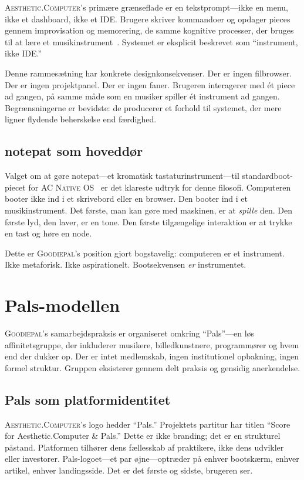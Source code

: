 \documentclass[10pt,letterpaper,twocolumn]{article}
\newcommand{\ac}{\textsc{Aesthetic.Computer}}
\newcommand{\acos}{\textsc{AC Native OS}}
\newcommand{\gp}{\textsc{Goodiepal}}
\begin{document}
\ac{}'s primære grænseflade er en tekstprompt---ikke en menu, ikke et dashboard, ikke et IDE. Brugere skriver kommandoer og opdager pieces gennem improvisation og memorering, de samme kognitive processer, der bruges til at lære et musikinstrument~\citep{scudder2026ac}. Systemet er eksplicit beskrevet som ``instrument, ikke IDE.''

Denne rammesætning har konkrete designkonsekvenser. Der er ingen filbrowser. Der er ingen projektpanel. Der er ingen faner. Brugeren interagerer med ét piece ad gangen, på samme måde som en musiker spiller ét instrument ad gangen. Begrænsningerne er bevidste: de producerer et forhold til systemet, der mere ligner flydende beherskelse end færdighed.

\subsection{notepat som hoveddør}

Valget om at gøre notepat---et kromatisk tastaturinstrument---til standardboot-piecet for \acos{}~\citep{scudder2026notepat} er det klareste udtryk for denne filosofi. Computeren booter ikke ind i et skrivebord eller en browser. Den booter ind i et musikinstrument. Det første, man kan gøre med maskinen, er at \emph{spille} den. Den første lyd, den laver, er en tone. Den første tilgængelige interaktion er at trykke en tast og høre en node.

Dette er \gp{}'s position gjort bogstavelig: computeren er et instrument. Ikke metaforisk. Ikke aspirationelt. Bootsekvensen \emph{er} instrumentet.

\section{Pals-modellen}

\gp{}'s samarbejdspraksis er organiseret omkring ``Pals''---en løs affinitetsgruppe, der inkluderer musikere, billedkunstnere, programmører og hvem end der dukker op. Der er intet medlemskab, ingen institutionel opbakning, ingen formel struktur. Gruppen eksisterer gennem delt praksis og gensidig anerkendelse.

\subsection{Pals som platformidentitet}

\ac{}'s logo hedder ``Pals.'' Projektets partitur har titlen ``Score for Aesthetic.Computer \& Pals.'' Dette er ikke branding; det er en strukturel påstand. Platformen tilhører dens fællesskab af praktikere, ikke dens udvikler eller investorer. Pals-logoet---et par øjne---optræder på enhver bootskærm, enhver artikel, enhver landingsside. Det er det første og sidste, brugeren ser.
\end{document}
